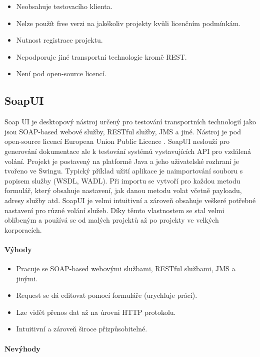 \documentclass[11pt,twoside,a4paper]{book}
\begin{document}
\begin{itemize}
  \item Neobsahuje testovacího klienta.
  \item Nelze použít free verzi na jakékoliv projekty kvůli licenčním podmínkám.
  \item Nutnost registrace projektu.
  \item Nepodporuje jiné transportní technologie kromě REST.
  \item Není pod open-source licencí.
\end{itemize}

\subsection{SoapUI}

Soap UI \cite{SoapUIHome} je desktopový nástroj určený pro testování
transportních technologií jako jsou SOAP-based webové služby, RESTful služby,
JMS a jiné. Nástroj je pod open-source licencí European Union Public
Licence \cite{EUPL07}. SoapUI neslouží pro generování dokumentace ale k testování
systémů vystavujících API pro vzdálená volání. Projekt je postavený na platformě
Java a jeho uživatelské rozhraní je tvořeno ve Swingu. Typický příklad užití
aplikace je naimportování souboru s popisem služby (WSDL, WADL). Při importu se
vytvoří pro každou metodu formulář, který obsahuje nastavení, jak danou metodu
volat včetně payloadu, adresy služby atd. SoapUI je velmi intuitivní a zároveň
obsahuje veškeré potřebné nastavení pro různé volání služeb. Díky těmto
vlastnostem se stal velmi oblíbeným a používá se od malých projektů až po
projekty ve velkých korporacích.

\paragraph{Výhody}

\begin{itemize}
  \item Pracuje se SOAP-based webovými službami, RESTful službami, JMS a jinými.
  \item Request se dá editovat pomocí formuláře (urychluje práci).
  \item Lze vidět přenos dat až na úrovni HTTP protokolu.
  \item Intuitivní a zároveň široce přizpůsobitelné.
\end{itemize}

\paragraph{Nevýhody}
\end{document}

